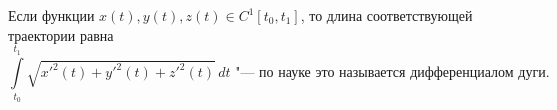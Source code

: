 
    	Если функции $x(t),y(t),z(t)\in C^1[t_0,t_1]$, то длина соответствующей траектории равна
    	$$\int\limits_{t_0}^{t_1}\sqrt{x'^2(t)+y'^2(t)+z'^2(t)}\,dt\text{ "--- по науке это называется дифференциалом дуги}.$$
    